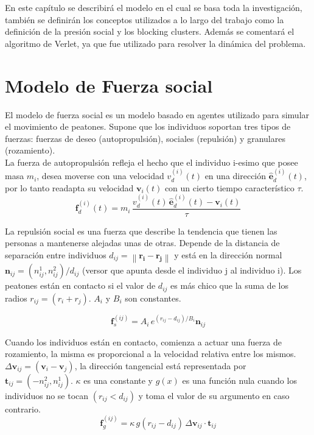 En este capítulo se describirá el modelo en el cual se basa toda la investigación, también se definirán los conceptos utilizados a lo largo del trabajo como la definición de la presión social y los blocking clusters. Además se comentará el algoritmo de Verlet, ya que fue utilizado para resolver la dinámica del problema. 

\section{\label{sfm}Modelo de Fuerza social}

El modelo de fuerza social es un modelo basado en agentes utilizado para simular el movimiento de peatones. Supone que los individuos soportan tres tipos de fuerzas: fuerzas de deseo (autopropulsión), sociales (repulsión) y granulares (rozamiento).  \\

La fuerza de autopropulsión refleja el hecho que el individuo i-esimo que posee masa $m_i$, desea  moverse con una velocidad $v_d^ {(i)}(t)$ en una dirección $\hat{\mathbf{e}}_d^ {(i)}(t)$, por lo tanto readapta su velocidad $\mathbf{v}_i(t)$ con un cierto tiempo característico $\tau$.
\begin{equation}
\mathbf{f}_d^ {(i)}(t)=m_i\,\displaystyle\frac{v_d^ {(i)}(t)\,\hat{\mathbf{e}}_d^ {(i)}(t)-\mathbf{v}_i(t)}{\tau}\label{fdeseo}
\end{equation}

La repulsión social es una fuerza que describe la tendencia que tienen las personas a mantenerse alejadas unas de otras. Depende de la distancia de separación entre individuos $d_{ij}=\left\|\mathbf{r_i}-\mathbf{r_j}\right\|$ y está en la dirección normal $\mathbf{n}_{ij}=(n_{ij}^1,n_{ij}^2)/d_{ij}$ (versor que apunta desde el individuo j al individuo i). Los peatones están en contacto si el valor de $d_{ij}$ es más chico que la suma de los radios $r_{ij}=(r_i+r_j)$. $A_i$ y 	$B_i$ son constantes.

\begin{equation}
\mathbf{f}_s^{(ij)}=A_i\,e^{(r_{ij}-d_{ij})/B_i}\mathbf{n}_{ij}\label{fsocial}
\end{equation} 

Cuando los individuos están en contacto, comienza a actuar una fuerza de rozamiento, la misma es proporcional a la velocidad relativa entre los mismos.  
$\Delta \mathbf{v}_{ij}=(\mathbf{v}_i-\mathbf{v}_j)$, la dirección tangencial está representada por $\mathbf{t}_{ij}=(-n_{ij}^2,n_{ij}^1)$.  $\kappa$ es una constante y $g(x)$ es una función nula cuando los individuos no se tocan $(r_{ij}<d_{ij})$ y toma el valor de su argumento en caso contrario. 
\begin{equation}
\mathbf{f}_g^{(ij)}=\kappa\,g(r_{ij}-d_{ij})\,\Delta \mathbf{v}_{ij}\cdot\mathbf{t}_{ij}\label{frozamiento}
\end{equation}

